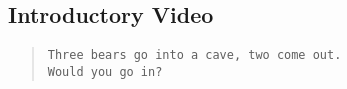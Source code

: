 
\subsection{Introductory Video}\label{video_intro}



\begin{quote}
{\tt Three bears go into a cave, two come out.\\ 
Would you go in?}
\end{quote}


\newpage
